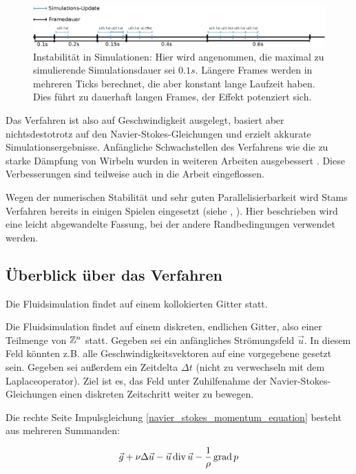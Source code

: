 \begin{figure}[ht]
\includegraphics[width=12cm]{images/simulation_blowup}
\caption{Instabilität in Simulationen: Hier wird angenommen, die maximal zu simulierende Simulationsdauer sei $0.1s$. Längere Frames werden in mehreren Ticks berechnet, die aber konstant lange Laufzeit haben. Dies führt zu dauerhaft langen Frames, der Effekt potenziert sich.}
\end{figure}

Das Verfahren ist also auf Geschwindigkeit ausgelegt, basiert aber
nichtsdestotrotz auf den Navier-Stokes-Gleichungen und erzielt akkurate
Simulationsergebnisse. Anfängliche Schwachstellen des Verfahrens wie die zu
starke Dämpfung von Wirbeln wurden in weiteren Arbeiten ausgebessert
\cite{Foster}. Diese Verbesserungen sind teilweise auch in die Arbeit
eingeflossen.

Wegen der numerischen Stabilität und sehr guten Parallelisierbarkeit wird Stams
Verfahren bereits in einigen Spielen eingesetzt (siehe \cite{Crane2007},
\cite{Peschel2009}). Hier beschrieben wird eine leicht abgewandelte
Fassung, bei der andere Randbedingungen verwendet werden.

\subsection{Überblick über das Verfahren}

Die Fluidsimulation findet auf einem kollokierten Gitter statt.

Die Fluidsimulation findet auf einem diskreten, endlichen Gitter, also einer
Teilmenge von $\mathbb{Z}^n$ statt. Gegeben sei ein anfängliches Strömungsfeld
$\vec{u}$. In diesem Feld könnten z.B. alle Geschwindigkeitsvektoren auf eine
vorgegebene  gesetzt sein. Gegeben sei außerdem ein
Zeitdelta $\Delta t$ (nicht zu verwechseln mit dem Laplaceoperator). Ziel ist
es, das Feld unter Zuhilfenahme der Navier-Stokes-Gleichungen einen diskreten
Zeitschritt weiter zu bewegen.

Die rechte Seite Impulsgleichung \eqref{navier_stokes_momentum_equation} besteht
aus mehreren Summanden:

\begin{equation}
\vec{g} +
\nu \Delta \vec{u} -
\vec{u} \operatorname*{div} \vec{u} -
\frac{
	1
}
{
	\rho
}
\operatorname*{grad} p
\end{equation}

